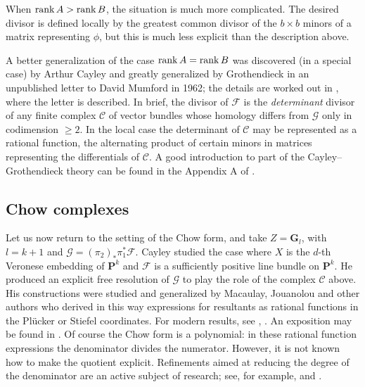 \documentclass{jams-l}
\theoremstyle{definition}
\theoremstyle{remark}
\newcommand{\C}{{\mathcal C}}
\newcommand{\F}{{\mathcal F}}
\newcommand{\G}{{\mathcal G}}
\newcommand{\GG}{{\mathbf G}}
\newcommand{\PP}{{\mathbf P}}
\newcommand{\rank}{\mathop{\rm rank}}
\begin{document}
When $\rank A > \rank B$,
the situation is much more complicated. 
The desired divisor is defined locally by the
greatest common divisor of the $b\times b$ minors
of a matrix representing $\phi$, but this is much
less explicit than the description above.

A better generalization of the case $\rank A = \rank B$ 
was discovered (in a special case) by Arthur Cayley
\cite{Cayley 1848} and greatly generalized by Grothendieck in
an unpublished letter to David Mumford in 1962; the details are
worked out in \cite{Knudsen and Mumford 1976}, where the letter is
described. In brief, the
divisor of $\F$ is the {\it determinant} divisor of any finite
complex $\C$ of vector bundles whose homology differs from
$\G$ only in codimension $\geq 2$. In the local case
the determinant of $\C$ may be represented as 
a rational function, the alternating
product of certain minors in matrices representing the 
differentials of $\C$. A good introduction to part
of the Cayley--Grothendieck theory can be found in
the
Appendix A of \cite{Gelfandetal.1994}.

\subsection*{Chow complexes} 

Let us now return to the setting of the 
Chow form, and take $Z=\GG_l$, with $l=k+1$ and
$\G=(\pi_2)_*\pi_1^* \F$. Cayley studied the case
where $X$ is the $d$-th Veronese embedding of $\PP^k$
and $\F$ is a sufficiently positive line bundle on $\PP^k$.
He produced an explicit free resolution of $\G$ to
play the role of the complex $\C$ above. His constructions were
studied and generalized by
Macaulay, Jouanolou and  other authors
who derived in this way expressions for resultants as rational functions in the
Pl\"ucker or Stiefel coordinates.  
For modern results, see \cite{Weyman and Zelevinsky 1994},
\cite{Jouanolou 1995}. An exposition may be found in \cite{Gelfandetal.1994}.
Of course the Chow form is
a polynomial:  in these rational function expressions the denominator
divides the numerator. However, it is not known how to make the
quotient explicit. Refinements aimed at reducing the degree of the
denominator are an active subject of research; see, for example,
\cite{D'Andrea and Dickenstein 2001}
and \cite{D'Andrea 2002}.
\end{document}
